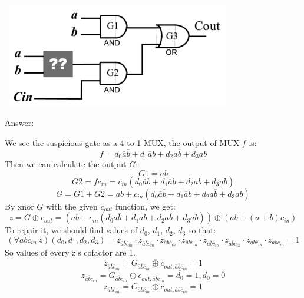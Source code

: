 \documentclass[12pt]{article}
\begin{document}
    \begin{center}
        \includegraphics[width = 4.00in, height = 1.80in]{figure2.png}
    \end{center}

    \noindent
    Answer:

    \noindent
    We see the suspicious gate as a 4-to-1 MUX, the output of MUX $f$ is:
    \[ f = d_0 \overline a \overline b + d_1 \overline a b + d_2 a \overline b + d_3 a b \]
    \noindent
    Then we can calculate the output $G$:
    \[ G1 = ab \]
    \[
        G2 = f c_{in} =
        c_{in} (d_0 \overline a \overline b + d_1 \overline a b + d_2 a \overline b + d_3 a b)
    \]
    \[
        G = G1 + G2 =
        ab+c_{in}(d_0 \overline a \overline b+d_1 \overline a b + d_2 a \overline b + d_3 a b)
    \]
    \noindent
    By xnor $G$ with the given $c_{out}$ function, we get:
    \[
        z = G \overline{\oplus} c_{out} =
        (ab+c_{in}(d_0 \overline a \overline b+d_1 \overline a b+d_2 a \overline b+d_3 a b))
        \overline{\oplus} (ab + (a + b)c_{in})
    \]
    \noindent
    To repair it, we should find values of $d_0$, $d_1$, $d_2$, $d_3$ so that:
    \[
        (\forall{abc_{in}}\ z)(d_0, d_1, d_2, d_3) =
        z_{\overline a \overline b \overline c_{in}} \cdot
        z_{\overline a \overline b c_{in}} \cdot
        z_{\overline a b \overline c_{in}} \cdot
        z_{\overline a b c_{in}} \cdot
        z_{a \overline b \overline c_{in}} \cdot
        z_{a \overline b c_{in}} \cdot
        z_{a b \overline c_{in}} \cdot
        z_{a b c_{in}} = 1
    \]
    \noindent
    So values of every z's cofactor are 1.
    \[
        z_{\overline a \overline b \overline c_{in}} =
        G_{\overline a \overline b \overline c_{in}} \overline \oplus
        c_{out,\overline a \overline b \overline c_{in}} = 1
    \]
    \[
        z_{\overline a \overline b c_{in}} =
        G_{\overline a \overline b c_{in}} \overline \oplus
        c_{out,\overline a \overline b c_{in}} = \overline{d_0} = 1,
        d_0 = 0
    \]
    \[
        z_{\overline a b \overline c_{in}} =
        G_{\overline a b \overline c_{in}} \overline \oplus
        c_{out,\overline a b \overline c_{in}} = 1
    \]
\end{document}

